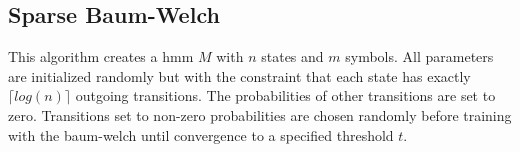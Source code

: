 \subsection{Sparse Baum-Welch}
This algorithm creates a \gls{hmm} $M$ with $n$ states and $m$ symbols.
All parameters are initialized randomly but with the constraint that each state has exactly $\lceil log(n) \rceil$ outgoing transitions. The probabilities of other transitions are set to zero.
Transitions set to non-zero probabilities are chosen randomly before training with the \gls{baum-welch} until convergence to a specified threshold $t$.